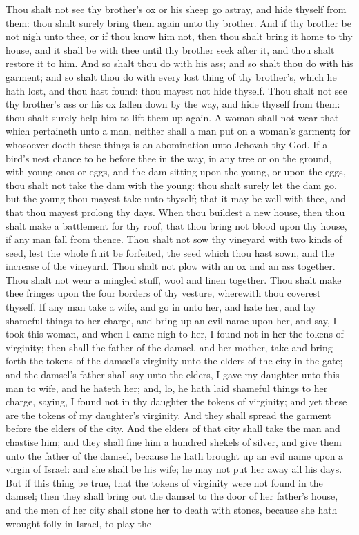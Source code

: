 Thou shalt not see thy brother’s ox or his sheep go astray, and hide thyself from them: thou shalt surely bring them again unto thy brother. And if thy brother be not nigh unto thee, or if thou know him not, then thou shalt bring it home to thy house, and it shall be with thee until thy brother seek after it, and thou shalt restore it to him. And so shalt thou do with his ass; and so shalt thou do with his garment; and so shalt thou do with every lost thing of thy brother’s, which he hath lost, and thou hast found: thou mayest not hide thyself. Thou shalt not see thy brother’s ass or his ox fallen down by the way, and hide thyself from them: thou shalt surely help him to lift them up again.  A woman shall not wear that which pertaineth unto a man, neither shall a man put on a woman’s garment; for whosoever doeth these things is an abomination unto Jehovah thy God.  If a bird’s nest chance to be before thee in the way, in any tree or on the ground, with young ones or eggs, and the dam sitting upon the young, or upon the eggs, thou shalt not take the dam with the young: thou shalt surely let the dam go, but the young thou mayest take unto thyself; that it may be well with thee, and that thou mayest prolong thy days.  When thou buildest a new house, then thou shalt make a battlement for thy roof, that thou bring not blood upon thy house, if any man fall from thence.  Thou shalt not sow thy vineyard with two kinds of seed, lest the whole fruit be forfeited, the seed which thou hast sown, and the increase of the vineyard. Thou shalt not plow with an ox and an ass together. Thou shalt not wear a mingled stuff, wool and linen together.  Thou shalt make thee fringes upon the four borders of thy vesture, wherewith thou coverest thyself.  If any man take a wife, and go in unto her, and hate her, and lay shameful things to her charge, and bring up an evil name upon her, and say, I took this woman, and when I came nigh to her, I found not in her the tokens of virginity; then shall the father of the damsel, and her mother, take and bring forth the tokens of the damsel’s virginity unto the elders of the city in the gate; and the damsel’s father shall say unto the elders, I gave my daughter unto this man to wife, and he hateth her; and, lo, he hath laid shameful things to her charge, saying, I found not in thy daughter the tokens of virginity; and yet these are the tokens of my daughter’s virginity. And they shall spread the garment before the elders of the city. And the elders of that city shall take the man and chastise him; and they shall fine him a hundred shekels of silver, and give them unto the father of the damsel, because he hath brought up an evil name upon a virgin of Israel: and she shall be his wife; he may not put her away all his days. But if this thing be true, that the tokens of virginity were not found in the damsel; then they shall bring out the damsel to the door of her father’s house, and the men of her city shall stone her to death with stones, because she hath wrought folly in Israel, to play the 